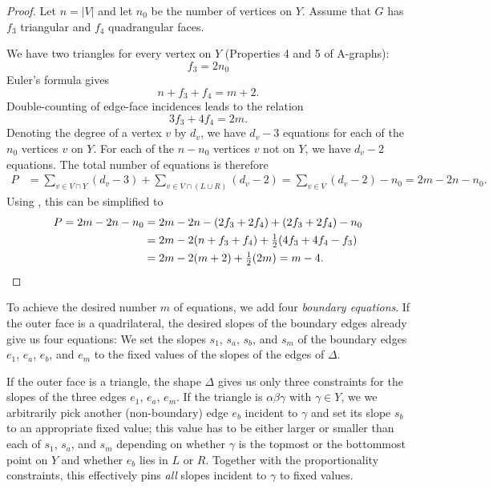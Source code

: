 \begin{proof}
Let $n=|V|$ and let $n_0$ be the number
of vertices on $Y$. Assume that $G$ has $f_3$ triangular and $f_4$
quadrangular faces.

We have two triangles for every vertex on $Y$ (Properties 4 and 5 of A-graphs):
\begin{equation}
\label{eq:f3}
f_3 = 2n_0
\end{equation}
Euler's formula gives
\begin{equation}
\label{eq:Euler}
n + f_3+f_4 = m+2.
\end{equation}
Double-counting of edge-face incidences leads to the relation
\begin{equation}
\label{eq:edge-face}
3f_3+4f_4=2m.
\end{equation}
Denoting the degree of a vertex $v$ by $d_v$,
we have $d_v-3$ equations for each of the $n_0$ vertices $v$ on $Y$. For each of the 
$n-n_0$ vertices $v$ not on $Y$, 
we have $d_v-2$ equations.
The total number of equations is therefore
\begin{align*}
P &= 
\sum_{v\in V\cap Y}(d_v-3)+
\sum_{v\in V\cap(L\cup R)}(d_v-2)
=
\sum_{v\in V}(d_v-2)-n_0
=
2m-2n-n_0.
\end{align*}
Using \thetag{\ref{eq:f3}--\ref{eq:edge-face}}, this can be
simplified to
\begin{align*}
  P%
      =
   2m-2n-n_0%
 &
                 = 2m -2n -(2f_3+2f_4) +(2f_3+2f_4)-n_0\\
&= 2m -2(n +f_3+f_4) +\tfrac12(4f_3+4f_4-f_3)\\
 &= 2m -2(m+2) +\tfrac12(2m) = m-4.
   \qedhere
\end{align*}
\end{proof}

To achieve the desired number $m$ of equations, we add
four \emph{boundary equations}.  If the outer face is a quadrilateral,
the desired slopes of the boundary edges already give us four equations:
We set
the slopes $s_1$, $s_a$, $s_b$, and $s_m$ of the boundary edges $e_1$, $e_a$,
$e_b$, and $e_m$ to the fixed values of the slopes of the edges of
$\Delta$.

If the outer face is a triangle, the shape $\Delta$ gives us
 only three constraints for the slopes of the three edges
 $e_1$, $e_a$, $e_m$.
 If the triangle is $\alpha\beta\gamma$ with $\gamma\in Y$, we
we arbitrarily pick another (non-boundary) edge $e_b$ incident to
$\gamma$ and set its slope $s_b$ to an appropriate fixed value;
this value has to be either larger or smaller than each of $s_1$,
$s_a$, and $s_m$
depending on whether $\gamma$ is the topmost or the bottommost point
on $Y$ and whether $e_b$ lies in $L$ or $R$.
Together with the
proportionality constraints, this effectively pins \emph{all} slopes
incident to $\gamma$ to fixed values.


